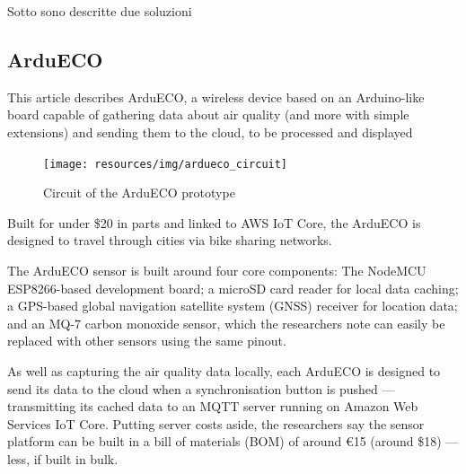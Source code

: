 	

	Sotto sono descritte due soluzioni
	
	\subsection{ArduECO}
		
		This article describes ArduECO, a wireless device based
		on an Arduino-like board capable of gathering data about air
		quality (and more with simple extensions) and sending them
		to the cloud, to be processed and displayed
		
		\begin{figure}[H]
			\centering
			\texttt{[image: resources/img/ardueco\_circuit]}
			\caption{Circuit of the ArduECO prototype}
		\end{figure}

		Built for under \$20 in parts and linked to AWS IoT Core, the ArduECO is designed to travel through cities via bike sharing networks.
		
		The ArduECO sensor is built around four core components: The NodeMCU ESP8266-based development board; a microSD card reader for local data caching; a GPS-based global navigation satellite system (GNSS) receiver for location data; and an MQ-7 carbon monoxide sensor, which the researchers note can easily be replaced with other sensors using the same pinout.
		
		As well as capturing the air quality data locally, each ArduECO is designed to send its data to the cloud when a synchronisation button is pushed — transmitting its cached data to an MQTT server running on Amazon Web Services IoT Core. Putting server costs aside, the researchers say the sensor platform can be built in a bill of materials (BOM) of around €15 (around \$18) — less, if built in bulk.
		
